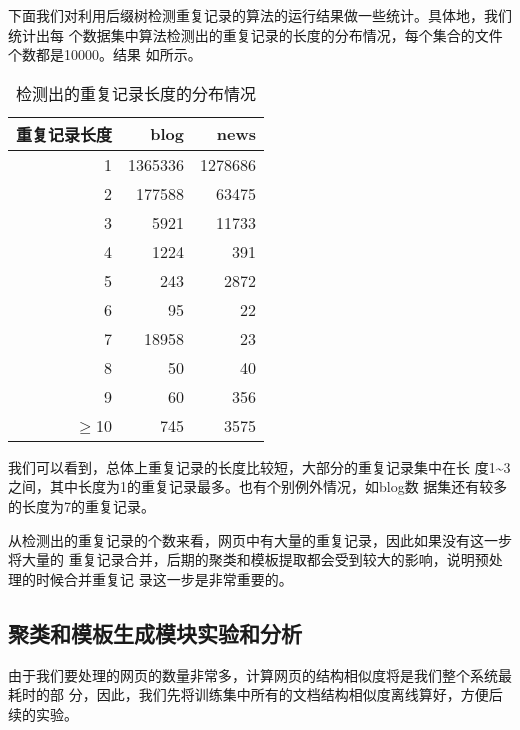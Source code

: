 下面我们对利用后缀树检测重复记录的算法的运行结果做一些统计。具体地，我们统计出每
个数据集中算法检测出的重复记录的长度的分布情况，每个集合的文件个数都是10000。结果
如所示。
\begin{table}[h]
  \centering
\begin{tabular}{rrr}
  \toprule
重复记录长度 & blog & news \\
\hline
1 & 1365336 & 1278686 \\
2 & 177588 & 63475 \\
3 & 5921 & 11733 \\
4 & 1224 & 391 \\
5 & 243 & 2872 \\
6 & 95 & 22 \\
7 & 18958 & 23 \\
8 & 50 & 40 \\
9 & 60 & 356 \\
$\ge$10 & 745 & 3575 \\
\bottomrule
\end{tabular}
  \caption{检测出的重复记录长度的分布情况\label{experiment:tab:recordlength}}
\end{table}
\begin{comment}
#+ORGTBL: SEND recordlength orgtbl-to-latex :splice nil :skip 0
| 重复记录长度 |    blog |    news |
|--------------+---------+---------|
|            1 | 1365336 | 1278686 |
|            2 |  177588 |   63475 |
|            3 |    5921 |   11733 |
|            4 |    1224 |     391 |
|            5 |     243 |    2872 |
|            6 |      95 |      22 |
|            7 |   18958 |      23 |
|            8 |      50 |      40 |
|            9 |      60 |     356 |
|       $>=$10 |     745 |    3575 |
\end{comment}


我们可以看到，总体上重复记录的长度比较短，大部分的重复记录集中在长
度1\textasciitilde{}3之间，其中长度为1的重复记录最多。也有个别例外情况，如blog数
据集还有较多的长度为7的重复记录。

从检测出的重复记录的个数来看，网页中有大量的重复记录，因此如果没有这一步将大量的
重复记录合并，后期的聚类和模板提取都会受到较大的影响，说明预处理的时候合并重复记
录这一步是非常重要的。
\subsection{聚类和模板生成模块实验和分析}
由于我们要处理的网页的数量非常多，计算网页的结构相似度将是我们整个系统最耗时的部
分，因此，我们先将训练集中所有的文档结构相似度离线算好，方便后续的实验。

